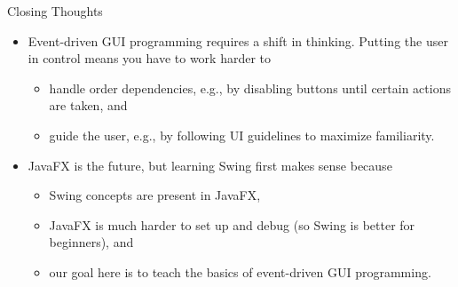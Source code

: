 \documentclass{beamer}
\begin{document}
\begin{frame}[fragile]{Closing Thoughts}


\begin{itemize}
\item Event-driven GUI programming requires a shift in thinking.  Putting the user in control means you have to work harder to
\begin{itemize}
  \item handle order dependencies, e.g., by disabling buttons until certain actions are taken, and
  \item guide the user, e.g., by following UI guidelines to maximize familiarity.
\end{itemize}
\item JavaFX is the future, but learning Swing first makes sense because
\begin{itemize}
  \item Swing concepts are present in JavaFX,
  \item JavaFX is much harder to set up and debug (so Swing is better for beginners), and
  \item our goal here is to teach the basics of event-driven GUI programming.
\end{itemize}

\end{itemize}


\end{frame}







\end{document}
